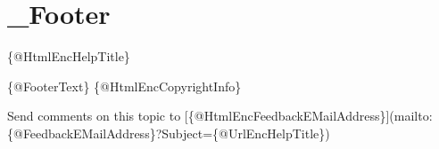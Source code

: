 \chapter{\+\_\+\+Footer}
\hypertarget{md__c_1_2_users_2jnyaz_2source_2repos_2_media_tek_documents_2packages_2_e_w_software_8_s_h_f_b_877c022da4a3c5b2e7d76dcf47164e56a}{}\label{md__c_1_2_users_2jnyaz_2source_2repos_2_media_tek_documents_2packages_2_e_w_software_8_s_h_f_b_877c022da4a3c5b2e7d76dcf47164e56a}
\{@\+Html\+Enc\+Help\+Title\}

\{@\+Footer\+Text\} \{@\+Html\+Enc\+Copyright\+Info\}

Send comments on this topic to \mbox{[}\{@\+Html\+Enc\+Feedback\+EMail\+Address\}\mbox{]}(mailto\+:\{@\+Feedback\+EMail\+Address\}?Subject=\{@\+Url\+Enc\+Help\+Title\}) 